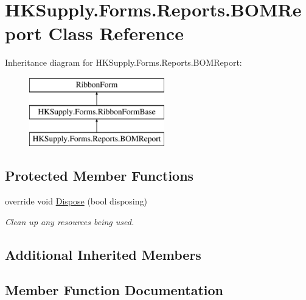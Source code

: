\hypertarget{class_h_k_supply_1_1_forms_1_1_reports_1_1_b_o_m_report}{}\section{H\+K\+Supply.\+Forms.\+Reports.\+B\+O\+M\+Report Class Reference}
\label{class_h_k_supply_1_1_forms_1_1_reports_1_1_b_o_m_report}
Inheritance diagram for H\+K\+Supply.\+Forms.\+Reports.\+B\+O\+M\+Report\+:\begin{figure}[H]
\begin{center}
\leavevmode
\includegraphics[height=3.000000cm]{class_h_k_supply_1_1_forms_1_1_reports_1_1_b_o_m_report}
\end{center}
\end{figure}
\subsection*{Protected Member Functions}
\begin{DoxyCompactItemize}
\item 
override void \mbox{\hyperlink{class_h_k_supply_1_1_forms_1_1_reports_1_1_b_o_m_report_a89d9a55cd574e447d1489a8b4f438dfa}{Dispose}} (bool disposing)
\begin{DoxyCompactList}\small\item\em Clean up any resources being used. \end{DoxyCompactList}\end{DoxyCompactItemize}
\subsection*{Additional Inherited Members}


\subsection{Member Function Documentation}
\mbox{\label{class_h_k_supply_1_1_forms_1_1_reports_1_1_b_o_m_report_a89d9a55cd574e447d1489a8b4f438dfa}} 
